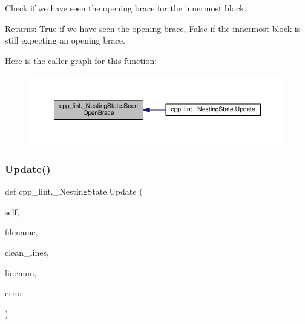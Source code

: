 \begin{DoxyVerb}Check if we have seen the opening brace for the innermost block.

Returns:
  True if we have seen the opening brace, False if the innermost
  block is still expecting an opening brace.
\end{DoxyVerb}
 Here is the caller graph for this function\+:
\nopagebreak
\begin{figure}[H]
\begin{center}
\leavevmode
\includegraphics[width=350pt]{classcpp__lint_1_1___nesting_state_a19f7e1db39b5e5bcdac60560dfaaf895_icgraph}
\end{center}
\end{figure}
\mbox{\label{classcpp__lint_1_1___nesting_state_a8ffa3f80c9867b44c7c6d28ed88ffe1e}} 
\subsubsection{\texorpdfstring{Update()}{Update()}}
{\footnotesize\ttfamily def cpp\+\_\+lint.\+\_\+\+Nesting\+State.\+Update (\begin{DoxyParamCaption}\item[{}]{self,  }\item[{}]{filename,  }\item[{}]{clean\+\_\+lines,  }\item[{}]{linenum,  }\item[{}]{error }\end{DoxyParamCaption})}

